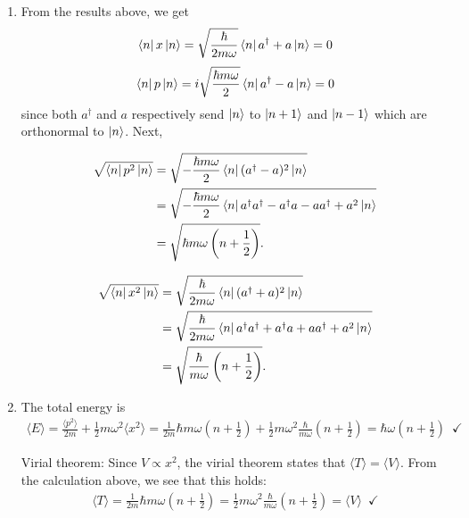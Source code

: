 \documentclass{article}
\theoremstyle{definition}
\newcommand{\f}[2]{\frac{#1}{#2}}
\newcommand{\lp}{\left(}
\newcommand{\rp}{\right)}
\begin{document}
\begin{enumerate}[label=\alph*)]
	\item From the results above, we get
	\begin{align*}
	\bra{n} x \ket{n} = \sqrt{\f{\hbar}{2 m\omega}}\bra{n} a^\dagger + a \ket{n} = 0
	\end{align*}
	\begin{align*}
	\bra{n} p \ket{n} = i\sqrt{\f{\hbar m\omega }{2}}\bra{n} a^\dagger - a \ket{n} = 0
	\end{align*}
	since both $a^\dagger$ and $a$ respectively send $\ket{n}$ to $\ket{n+1}$ and $\ket{n-1}$ which are orthonormal to $\ket{n}$. Next, 
	
	
	\begin{align*}
	\sqrt{\bra{n}p^2 \ket{n}} &= \sqrt{-\f{\hbar m\omega}{2}\bra{n} (a^\dagger - a)^2 \ket{n} }\\
	&= \sqrt{-\f{\hbar m\omega}{2} \bra{n} a^\dagger a^\dagger -a^\dagger a - aa^\dagger + a^2 \ket{n} }\\
	&= \sqrt{\hbar m\omega \lp n+ \f{1}{2} \rp}.
	\end{align*}
	
	\begin{align*}
	\sqrt{\bra{n}x^2 \ket{n}} &= \sqrt{\f{\hbar}{2 m\omega}\bra{n} (a^\dagger + a)^2 \ket{n} }\\
	&= \sqrt{\f{\hbar}{2 m\omega}\bra{n} a^\dagger a^\dagger +a^\dagger a + aa^\dagger + a^2 \ket{n} }\\
	&= \sqrt{\f{\hbar}{m\omega}\lp n+ \f{1}{2} \rp}.
	\end{align*}
	
	
	\item The total energy is 
	\begin{align*}
	\langle  E\rangle  = \f{\langle p^2\rangle }{2m} + \f{1}{2}m\omega^2 \langle x^2\rangle = \f{1}{2m}\hbar m\omega \lp n+ \f{1}{2} \rp + \f{1}{2}m\omega^2 \f{\hbar}{m\omega}\lp n+ \f{1}{2} \rp  = \hbar \omega\lp n+ \f{1}{2}\rp \,\,\, \checkmark
	\end{align*}
	
	Virial theorem: Since $V\propto x^2$, the virial theorem states that $\langle T \rangle  = \langle V \rangle$. From the calculation above, we see that this holds:
	\begin{align*}
	\langle T \rangle =  \f{1}{2m}\hbar m\omega \lp n+ \f{1}{2} \rp  = \f{1}{2}m\omega^2 \f{\hbar}{m\omega}\lp n+ \f{1}{2} \rp = \langle V \rangle \,\,\, \checkmark
	\end{align*}
	

\end{enumerate}
\end{document}

